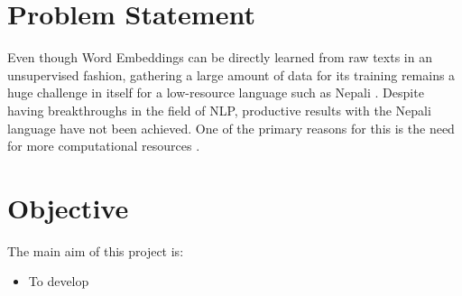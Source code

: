         \section{Problem Statement} 
        Even though Word Embeddings can be directly learned from raw texts in an unsupervised fashion, gathering a large amount of data for its training remains a huge challenge in itself for a low-resource language such as Nepali \cite{koirala-niraula-2021-npvec1}. Despite having breakthroughs in the field of NLP, productive results with the Nepali language have not been achieved. One of the primary reasons for this is the need for more computational resources \cite{NepaliBERT}.
        \section{Objective}
            The main aim of this project is:
            \begin{itemize}
                \item To develop
            \end{itemize}

